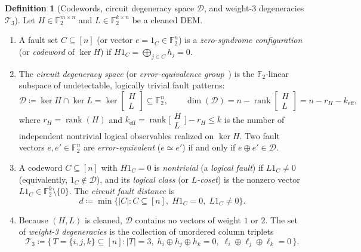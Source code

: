 \documentclass[12pt]{article}
\theoremstyle{definition}
\newtheorem{definition}{Definition}
\newcommand{\Ftwo}{\mathbb{F}_2}
\DeclareMathOperator{\rank}{rank}
\newcommand{\Dc}{\mathcal{D}}
\newcommand{\Tc}{\mathcal{T}_3}
\begin{document}
\begin{definition}[Codewords, circuit degeneracy space $\Dc$, and weight-3 degeneracies $\Tc$]\label{def:degen}
Let $H \in \Ftwo^{m \times n}$ and $L \in \Ftwo^{k \times n}$ be a cleaned DEM.
\begin{enumerate}[label=(\alph*)]
  \item A fault set $C \subseteq [n]$ (or vector $e = 1_C \in \Ftwo^n$) is a \emph{zero-syndrome configuration} (or
    \emph{codeword} of $\ker H$) if $H 1_C = \bigoplus_{j \in C} h_j = 0$.
  \item The \emph{circuit degeneracy space} (or \emph{error-equivalence group}~\cite{Pryadko2020MLD}) is the
    $\Ftwo$-linear subspace of undetectable, logically trivial fault patterns:
    \begin{equation}\label{eq:D_def}
      \Dc \coloneqq \ker H \cap \ker L = \ker \begin{bmatrix} H \\ L \end{bmatrix} \subseteq \Ftwo^n, \qquad
      \dim(\Dc) = n - \rank\begin{bmatrix} H \\ L \end{bmatrix} = n - r_H - k_{\mathrm{eff}},
    \end{equation}
    where $r_H = \rank(H)$ and $k_{\mathrm{eff}} = \rank\bigl[\begin{smallmatrix} H \\ L \end{smallmatrix}\bigr] -
    r_H \le k$ is the number of independent nontrivial logical observables realized on $\ker H$. Two fault vectors
    $e, e' \in \Ftwo^n$ are \emph{error-equivalent} ($e \simeq e'$) if and only if $e \oplus e' \in \Dc$.
  \item A codeword $C \subseteq [n]$ with $H 1_C = 0$ is \emph{nontrivial} (a \emph{logical fault}) if $L 1_C \neq
    0$ (equivalently, $1_C \notin \Dc$), and its \emph{logical class} (or \emph{$L$-coset}) is the nonzero vector
    $L 1_C \in \Ftwo^k \setminus \{0\}$. The \emph{circuit fault distance} is
    \begin{equation}\label{eq:d_def}
      d \coloneqq \min\bigl\{|C| : C \subseteq [n],\; H 1_C = 0,\; L 1_C \neq 0\bigr\}.
    \end{equation}
  \item Because $(H, L)$ is cleaned, $\Dc$ contains no vectors of weight $1$ or $2$. The set of \emph{weight-3
    degeneracies} is the collection of unordered column triplets
    \begin{equation}\label{eq:T3_def}
      \Tc \coloneqq \bigl\{\, T = \{i, j, k\} \subseteq [n] : |T| = 3,\;
      h_i \oplus h_j \oplus h_k = 0,\; \ell_i \oplus \ell_j \oplus \ell_k = 0 \,\bigr\}.
    \end{equation}
\end{enumerate}
\end{definition}
\end{document}
